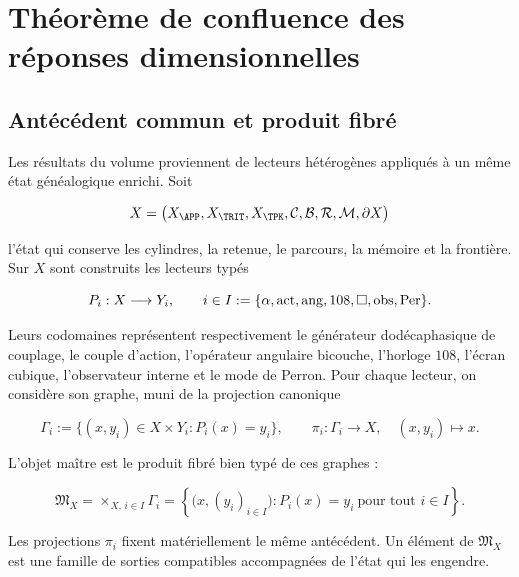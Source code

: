 \section{Théorème de confluence des réponses dimensionnelles}
\label{rm:ch:confluencia-general}

\subsection{Antécédent commun et produit fibré}

Les résultats du volume proviennent de lecteurs hétérogènes appliqués à un même état généalogique enrichi. Soit

\begin{equation}
 X=\bigl(X_{\APP},X_{\TRIT},X_{\TPK},
          \mathcal C,\mathcal B,\mathcal R,\mathcal M,\partial X\bigr)
 \label{rm:eq:confluence-state}
\end{equation}

l’état qui conserve les cylindres, la retenue, le parcours, la mémoire et la frontière. Sur \(X\) sont construits les lecteurs typés

\begin{equation}
 P_i:X\longrightarrow Y_i,
 \qquad
 i\in I:=\{\alpha,{\rm act},{\rm ang},108,\square,{\rm obs},{\rm Per}\}.
 \label{rm:eq:confluence-objects}
\end{equation}

Leurs codomaines représentent respectivement le générateur dodécaphasique de couplage, le couple d’action, l’opérateur angulaire bicouche, l’horloge \(108\), l’écran cubique, l’observateur interne et le mode de Perron. Pour chaque lecteur, on considère son graphe, muni de la projection canonique

\begin{equation}
 \Gamma_i:=\{(x,y_i)\in X\times Y_i:P_i(x)=y_i\},
 \qquad
 \pi_i:\Gamma_i\longrightarrow X,
 \quad (x,y_i)\longmapsto x.
 \label{rm:eq:confluence-reader-graphs}
\end{equation}

L’objet maître est le produit fibré bien typé de ces graphes :

\begin{equation}
 \boxed{
 \mathfrak M_X=
 \mathop{\times}_{X,\,i\in I}\Gamma_i
 =\left\{\bigl(x,(y_i)_{i\in I}\bigr):
 P_i(x)=y_i\ \text{pour tout }i\in I\right\}.}
 \label{rm:eq:master-fiber-product}
\end{equation}

Les projections \(\pi_i\) fixent matériellement le même antécédent. Un élément de \(\mathfrak M_X\) est une famille de sorties compatibles accompagnées de l’état qui les engendre.

